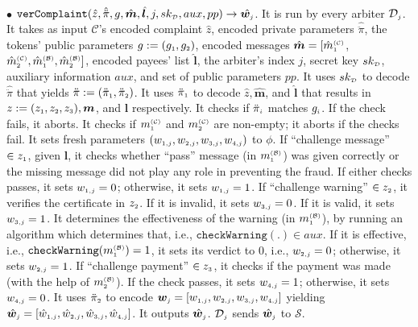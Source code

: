 \begin{definition}
\

\item  [$\bullet$] $\mathtt{verComplaint}( \hat z, \hat{\ddot{\pi}}, g, \hat{\bm m}, \hat{\bm{l}}, j, sk_{\scriptscriptstyle\mathcal D}, aux, pp)\rightarrow \hat{\bm{w}_{\scriptscriptstyle j}}$. It is run by every arbiter $\mathcal{D}_{\scriptscriptstyle  j}$. It takes as input  $\mathcal{C}$'s encoded complaint $\hat z$,  encoded private parameters $\hat{\ddot{\pi}}$,  the tokens' public parameters $g:=(g_{\scriptscriptstyle 1}, g_{\scriptscriptstyle 2})$,  encoded  messages $\hat{\bm m}=[\hat{m}_{\scriptscriptstyle 1}^{\scriptscriptstyle(\mathcal C)}$, $\hat{m}_{\scriptscriptstyle 2}^{\scriptscriptstyle(\mathcal C)}, \hat{m}_{\scriptscriptstyle 1}^{\scriptscriptstyle(\mathcal B)}, \hat{m}_{\scriptscriptstyle 2}^{\scriptscriptstyle(\mathcal B)}]$, encoded payees' list $ \hat{\bm{l}}$,  the  arbiter's index $j$, secret key $sk_{\scriptscriptstyle\mathcal D}$,   auxiliary information $aux$, and set of public parameters $pp$.  It uses $sk_{\scriptscriptstyle\mathcal D}$ to decode $\hat{\ddot{\pi}}$ that yields  $\ddot{\pi}:=(\ddot{\pi}_{\scriptscriptstyle 1}, \ddot{\pi}_{\scriptscriptstyle 2})$. It uses $\ddot{\pi}_{\scriptscriptstyle 1}$ to decode  $\hat z,  \hat{\bm{m}}$, and  $\hat{\bm{l}}$ that results in $z:=(z_{\scriptscriptstyle 1}, z_{\scriptscriptstyle 2}, z_{\scriptscriptstyle 3}), {\bm m}$, and  ${\bm{l}}$ respectively.  It checks if $\ddot{\pi}_{\scriptscriptstyle i}$ matches  $g_{\scriptscriptstyle i}$. If the check fails, it aborts.  It  checks  if ${m}_{\scriptscriptstyle 1}^{\scriptscriptstyle(\mathcal C)}$ and ${m}_{\scriptscriptstyle 2}^{\scriptscriptstyle(\mathcal C)}$ are non-empty; it aborts if the checks fail. It  sets  fresh parameters $(w_{\scriptscriptstyle 1,j}, w_{\scriptscriptstyle 2,j},  w_{\scriptscriptstyle 3,j},   w_{\scriptscriptstyle 4,j})$ to $\phi$. If ``challenge message'' $\in z_{\scriptscriptstyle 1}$, given $\bm l$,  it checks whether  ``pass''  message (in ${m}^{\scriptscriptstyle\mathcal{(B)}}_{\scriptscriptstyle1}$) was given correctly or the missing message did not play any role in preventing the fraud.  If either checks passes, it sets  $w_{\scriptscriptstyle 1,j}=0$;  otherwise,  it sets $w_{\scriptscriptstyle 1,j}=1$. If ``challenge warning'' $\in z_{\scriptscriptstyle 2}$,   it verifies  the certificate in $z_{\scriptscriptstyle 2}$.  If it is invalid,  it sets $ w_{\scriptscriptstyle 3,j}=0$.  If it is valid, it sets  $w_{\scriptscriptstyle 3,j}=1$. It  determines the effectiveness of the warning (in ${m}^{\scriptscriptstyle\mathcal{(B)}}_{\scriptscriptstyle1}$), by running an algorithm which  determines that, i.e., $\mathtt{checkWarning}(.)\in aux$. If  it is effective, i.e., $\mathtt{checkWarning}({m}^{\scriptscriptstyle\mathcal{(B)}}_{\scriptscriptstyle1})= 1$,  it sets its verdict to $0$, i.e., $w_{\scriptscriptstyle 2,j}=0$; otherwise, it sets $w_{\scriptscriptstyle 2,j}=1$.  If ``challenge payment'' $\in z_{\scriptscriptstyle 3}$,    it checks if the payment was made (with the help of ${m}_{\scriptscriptstyle 2}^{\scriptscriptstyle(\mathcal B)}$). If the check passes,  it sets $w_{\scriptscriptstyle 4,j}=1$; otherwise, it sets $w_{\scriptscriptstyle 4,j}=0$.  It uses $\ddot \pi_{\scriptscriptstyle 2}$ to encode  $\bm{w}_{\scriptscriptstyle j} = [w_{\scriptscriptstyle 1,j}, w_{\scriptscriptstyle 2, j}, w_{\scriptscriptstyle 3, j}, w_{\scriptscriptstyle 4, j}]$ yielding  $\hat{\bm{w}}_{\scriptscriptstyle j}= [\hat {w}_{\scriptscriptstyle 1,j}, \hat{w}_{\scriptscriptstyle 2, j}, \hat{w}_{\scriptscriptstyle 3, j}, \hat{w}_{\scriptscriptstyle 4, j}]$. It outputs $\hat{\bm{w}}_{\scriptscriptstyle j}$. $\mathcal{D}_{\scriptscriptstyle  j}$ sends $\hat{\bm{w}}_{\scriptscriptstyle j}$ to  $\mathcal{S}$. 
%


\end{definition}
